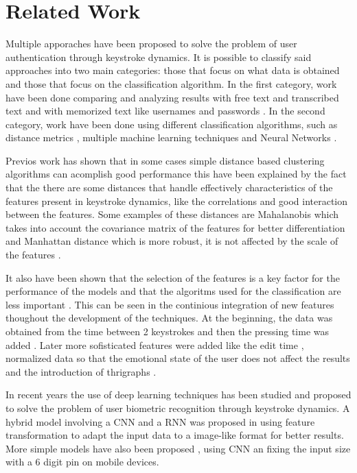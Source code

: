 \section{Related Work}

Multiple apporaches have been proposed to solve the problem of user authentication through keystroke dynamics. It is possible to classify said approaches into two main categories: those that focus on what data is obtained and those that focus on the classification algorithm. In the first category, work have been done comparing and analyzing results with free text and transcribed text \cite{old,programmers} and with memorized text like usernames and passwords \cite{bleha1990login, pnn}. In the second category, work have been done using different classification algorithms, such as distance metrics \cite{combine_distance}, multiple machine learning techniques \cite{machine_learning} and Neural Networks \cite{deep_learning, maiorana2019deepkey}.

Previos work has shown that in some cases simple distance based clustering algorithms can acomplish good performance \cite{robinson1998login, bergadano2002norm_distance,de2000mahalanobis,programmers} this have been explained by the fact that the there are some distances that handle effectively characteristics of the features present in keystroke dynamics, like the correlations  and good interaction between the features. Some examples of these distances are Mahalanobis which takes into account the covariance matrix of the features for better differentiation and  Manhattan distance which is more robust, it is not affected by the scale of the features \cite{combine_distance}. 

It also have been shown that the selection of the features is a key factor for the performance of the models and that the algoritms used for the classification are less important \cite{pnn}. This can be seen in the continious integration of new features thoughout the development of the techniques. At the beginning, the data was obtained from the time between 2 keystrokes  \cite{bleha1990login} and then the pressing time was added \cite{robinson1998login}. Later more sofisticated features were added like the edit time \cite{machine_learning}, normalized data so that the emotional state of the user does not affect the results  and the introduction of thrigraphs \cite{bergadano2002norm_distance}.

In recent years the use of deep learning techniques has been studied and proposed to solve the problem of user biometric recognition through keystroke dynamics. A hybrid model involving a CNN and a RNN was proposed in \cite{deep_learning} using feature transformation to adapt the input data to a image-like format for better results. More simple models have also been proposed \cite{maiorana2019deepkey}, using CNN an fixing the input size with a 6 digit pin on mobile devices.